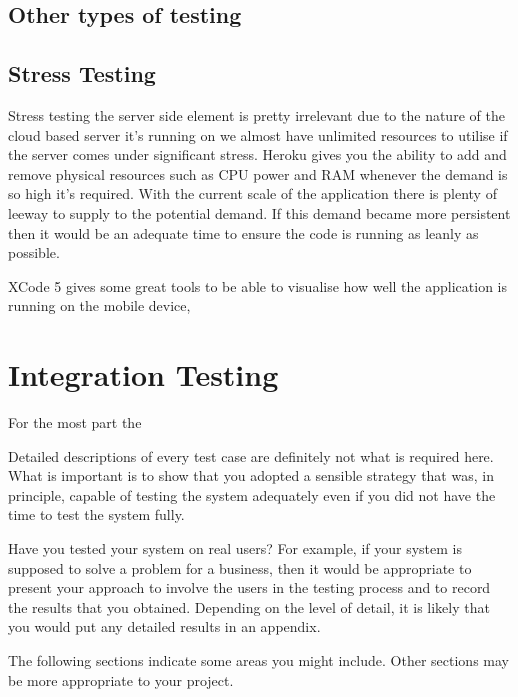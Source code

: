 \subsection{Other types of testing}

\subsection{Stress Testing}
	Stress testing the server side element is pretty irrelevant due to the nature of the cloud based server it's running on we almost have unlimited resources to utilise if the server comes under significant stress. Heroku gives you the ability to add and remove physical resources such as CPU power and RAM whenever the demand is so high it's required. With the current scale of the application there is plenty of leeway to supply to the potential demand. If this demand became more persistent then it would be an adequate time to ensure the code is running as leanly as possible. 

	XCode 5 gives some great tools to be able to visualise how well the application is running on the mobile device, 


\section{Integration Testing}
	For the most part the 



Detailed descriptions of every test case are definitely not what is required here. What is important is to show that you adopted a sensible strategy that was, in principle, capable of testing the system adequately even if you did not have the time to test the system fully.

Have you tested your system on real users? For example, if your system is supposed to solve a problem for a business, then it would be appropriate to present your approach to involve the users in the testing process and to record the results that you obtained. Depending on the level of detail, it is likely that you would put any detailed results in an appendix.

The following sections indicate some areas you might include. Other sections may be more appropriate to your project. 